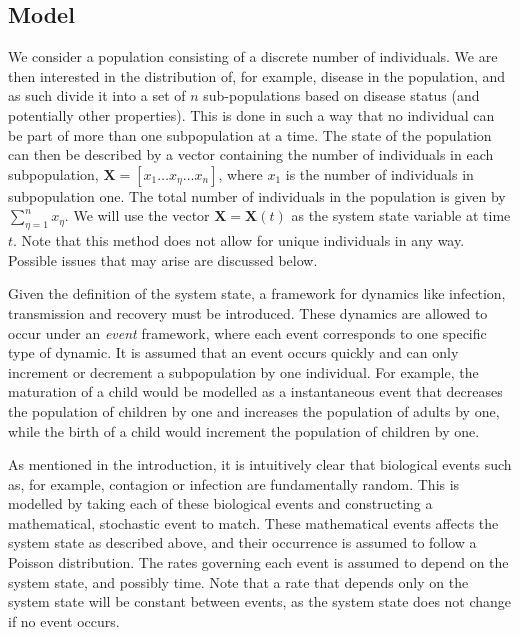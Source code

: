 \documentclass[10pt,a4paper]{article}
\begin{document}

\subsection{Model}

We consider a population consisting of a discrete number of individuals. We are then interested in the distribution of, for example, disease in the population, and as such divide it into a set of $n$ sub-populations based on disease status (and potentially other properties). This is done in such a way that no individual can be part of more than one subpopulation at a time. The state of the population can then be described by a vector containing the number of individuals in each subpopulation, $\bm{X} = \left[ x_1 \ldots x_\eta \ldots x_n\right]$, where $x_1$ is the number of individuals in subpopulation one. The total number of individuals in the population is given by $\sum_{\eta = 1}^n x_{\eta}$. We will use the vector $\bm{X} = \bm{X} \left( t \right)$ as the system state variable at time $t$. Note that this method does not allow for unique individuals in any way. Possible issues that may arise are discussed below.

Given the definition of the system state, a framework for dynamics like infection, transmission and recovery must be introduced. These dynamics are allowed to occur under an \emph{event} framework, where each event corresponds to one specific type of dynamic. It is assumed that an event occurs quickly and can only increment or decrement a subpopulation by one individual. For example, the maturation of a child would be modelled as a instantaneous event that decreases the population of children by one and increases the population of adults by one, while the birth of a child would increment the population of children by one.

As mentioned in the introduction, it is intuitively clear that biological events such as, for example, contagion or infection are fundamentally random. This is modelled by taking each of these biological events and constructing a mathematical, stochastic event to match. These mathematical events affects the system state as described above, and their occurrence is assumed to follow a Poisson distribution. The rates governing each event is assumed to depend on the system state, and possibly time. Note that a rate that depends only on the system state will be constant between events, as the system state does not change if no event occurs.
\end{document}
